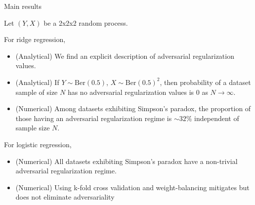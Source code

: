 \begin{frame}{Main results}

  Let $(Y, X)$ be a 2x2x2 random process.\newline

  For ridge regression,
  \begin{itemize}
    \item (Analytical) We find an explicit description of adversarial regularization values.
    \item (Analytical) If $Y \sim \mathrm{Ber}(0.5)$, $X \sim \mathrm{Ber}(0.5)^2$, then probability of a dataset sample of size $N$ has no adversarial regularization values is 0 as $N \rightarrow \infty$.
    \item (Numerical) Among datasets exhibiting Simpson's paradox, the proportion of those having an adversarial regularization regime is $\sim 32\%$ independent of sample size $N$.
  \end{itemize}

For logistic regression,
\begin{itemize}
  \item (Numerical) All datasets exhibiting Simpson's paradox have a non-trivial adversarial regularization regime.
  \item (Numerical) Using k-fold cross validation and weight-balancing mitigates but does not eliminate adversariality
\end{itemize}

\end{frame}






